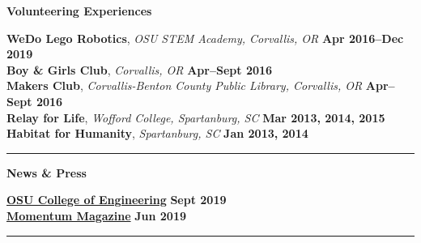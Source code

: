 \documentclass[10pt]{letter}
\begin{document}
\begin{center}
\textbf{\large Volunteering Experiences} \\
\end{center}
\vspace{-5pt}
\textbf{WeDo Lego Robotics}, \textit{OSU STEM Academy, Corvallis, OR}
\hfill
\textbf{Apr 2016--Dec 2019} \\
\vspace{0pt}
\textbf{Boy \& Girls Club}, \textit{Corvallis, OR}
\hfill
\textbf{Apr--Sept 2016} \\
\vspace{0pt}
\textbf{Makers Club}, \textit{Corvallis-Benton County Public Library, Corvallis, OR}
\hfill
\textbf{Apr--Sept 2016} \\
\vspace{0pt}
\textbf{Relay for Life}, \textit{Wofford College, Spartanburg, SC}
\hfill
\textbf{Mar 2013, 2014, 2015} \\
\vspace{0pt}
\textbf{Habitat for Humanity}, \textit{Spartanburg, SC}
\hfill
\textbf{Jan 2013, 2014} \\

\par\noindent\rule{\textwidth}{0.5pt}


\begin{center}
\textbf{\large News \& Press} \\
\end{center}
\vspace{-5pt}
\href{https://cbee.oregonstate.edu/node/809}{\textbf{OSU College of Engineering}}
\hfill
\textbf{Sept 2019} \\
\vspace{0pt}
\href{http://www.journalgraphicsdigitalpublications.com/epubs/OSUALUMNIASSOCIATIONINC/MomentumSpring2019/viewer/desktop/}{\textbf{Momentum Magazine}}
\hfill
\textbf{Jun 2019} \\

\par\noindent\rule{\textwidth}{0.5pt}


\end{document}
